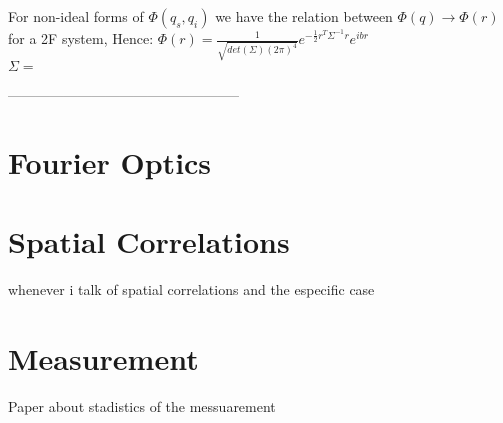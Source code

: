 For non-ideal forms of $\Phi (q_s,q_i)$ we have the relation between $\Phi (q) \rightarrow \Phi (r)$ for a 2F system, Hence: $\Phi(r)=\frac{1}{\sqrt{det(\Sigma)(2 \pi)^4}} e^{- \frac{1}{2} r^T \Sigma^{-1} r} e^{ibr}$ \\
$\Sigma=$


--------------------------------------------------
\section{Fourier Optics}
\section{Spatial Correlations}
\cite{omar} whenever i talk of spatial correlations and the especific case

\section{Measurement}
Paper about stadistics of the messuarement\cite{opticalComunications} 
